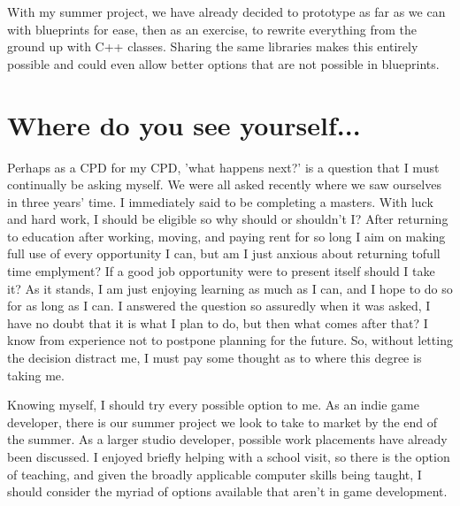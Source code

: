 \documentclass{scrartcl}
\begin{document}
With my summer project, we have already decided to prototype as far as we can with blueprints for ease, then as an exercise, to rewrite everything from the ground up with C++ classes.  Sharing the same libraries makes this entirely possible and could even allow better options that are not possible in blueprints.

\section*{Where do you see yourself...}

Perhaps as a CPD for my CPD, 'what happens next?' is a question that I must continually be asking myself.  We were all asked recently where we saw ourselves in three years' time.  I immediately said to be completing a masters.  With luck and hard work, I should be eligible so why should or shouldn't I?  After returning to education after working, moving, and paying rent for so long I aim on making full use of every opportunity I can, but am I just anxious about returning tofull time emplyment?  If a good job opportunity were to present itself should I take it?  As it stands, I am just enjoying learning as much as I can, and I hope to do so for as long as I can.  I answered the question so assuredly when it was asked, I have no doubt that it is what I plan to do, but then what comes after that?  I know from experience not to postpone planning for the future.  So, without letting the decision distract me, I must pay some thought as to where this degree is taking me.

Knowing myself, I should try every possible option to me.  As an indie game developer, there is our summer project we look to take to market by the end of the summer.  As a larger studio developer, possible work placements have already been discussed.  I enjoyed briefly helping with a school visit, so there is the option of teaching, and given the broadly applicable computer skills being taught, I should consider the myriad of options available that aren't in game development.
\end{document}
